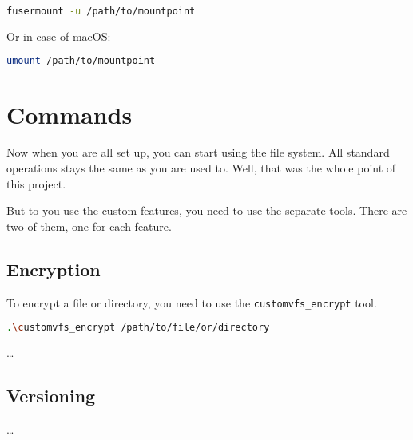 \begin{lstlisting}[language=bash, basicstyle=\ttfamily\small]
  fusermount -u /path/to/mountpoint
\end{lstlisting}

Or in case of macOS:

\begin{lstlisting}[language=bash, basicstyle=\ttfamily\small]
    umount /path/to/mountpoint
\end{lstlisting}


\section*{Commands}

Now when you are all set up, you can start using the file system.
All standard operations stays the same as you are used to.
Well, that was the whole point of this project.

But to you use the custom features, you need to use the separate tools.
There are two of them, one for each feature.

\subsection*{Encryption}

To encrypt a file or directory, you need to use the \texttt{customvfs\_encrypt} tool.

\begin{lstlisting}[language=bash, basicstyle=\ttfamily\small]
  .\customvfs_encrypt /path/to/file/or/directory
\end{lstlisting}

\ldots

\subsection*{Versioning}

\ldots
